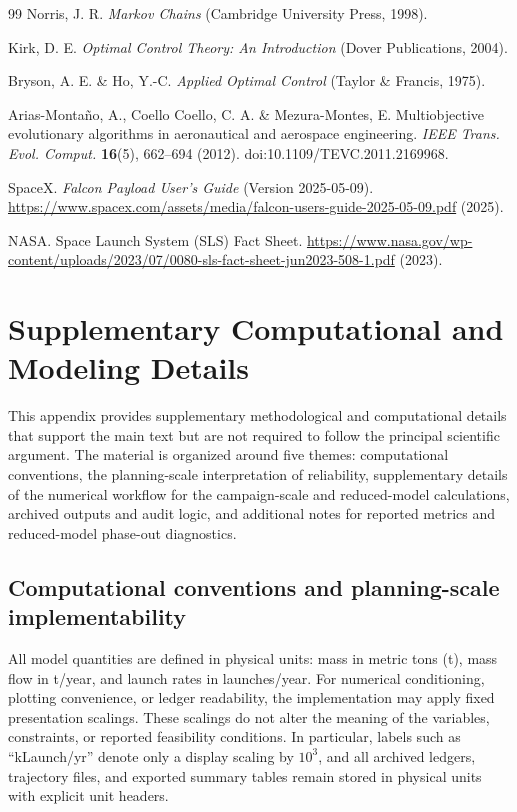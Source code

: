 \documentclass[12pt]{article}
\begin{document}
\begin{thebibliography}{99}
	Norris, J. R.
	\textit{Markov Chains}
	(Cambridge University Press, 1998).
	
	Kirk, D. E.
	\textit{Optimal Control Theory: An Introduction}
	(Dover Publications, 2004).
	
	Bryson, A. E. \& Ho, Y.-C.
	\textit{Applied Optimal Control}
	(Taylor \& Francis, 1975).
	
	Arias-Monta\~no, A., Coello Coello, C. A. \& Mezura-Montes, E.
	Multiobjective evolutionary algorithms in aeronautical and aerospace engineering.
	\textit{IEEE Trans. Evol. Comput.} \textbf{16}(5), 662--694 (2012).
	doi:10.1109/TEVC.2011.2169968.
	
	SpaceX.
	\textit{Falcon Payload User's Guide} (Version 2025-05-09).
	\url{https://www.spacex.com/assets/media/falcon-users-guide-2025-05-09.pdf} (2025).
	
	NASA.
	Space Launch System (SLS) Fact Sheet.
	\url{https://www.nasa.gov/wp-content/uploads/2023/07/0080-sls-fact-sheet-jun2023-508-1.pdf} (2023).
	
\end{thebibliography}

\appendix

\section{Supplementary Computational and Modeling Details}
\label{app:supplementary_methods}

This appendix provides supplementary methodological and computational details that support the main text but are not required to follow the principal scientific argument. The material is organized around five themes: computational conventions, the planning-scale interpretation of reliability, supplementary details of the numerical workflow for the campaign-scale and reduced-model calculations, archived outputs and audit logic, and additional notes for reported metrics and reduced-model phase-out diagnostics.

\subsection{Computational conventions and planning-scale implementability}
\label{app:comp_conventions}

All model quantities are defined in physical units: mass in metric tons (t), mass flow in t/year, and launch rates in launches/year. For numerical conditioning, plotting convenience, or ledger readability, the implementation may apply fixed presentation scalings. These scalings do not alter the meaning of the variables, constraints, or reported feasibility conditions. In particular, labels such as ``kLaunch/yr'' denote only a display scaling by $10^3$, and all archived ledgers, trajectory files, and exported summary tables remain stored in physical units with explicit unit headers.
\end{document}
